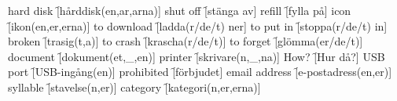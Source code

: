\begin{questions}
\begin{multicols}{2}
        \question hard disk \f[hårddisk(en,ar,arna)]
        \question shut off \f[stänga av]
        \question refill \f[fylla på]
        \question icon \f[ikon(en,er,erna)]
        \question to download \f[ladda(r/de/t) ner]
        \question to put in \f[stoppa(r/de/t) in]
        \question broken \f[trasig(t,a)]
        \question to crash \f[krascha(r/de/t)]
        \question to forget \f[glömma(er/de/t)]
        \question document \f[dokument(et,\_,en)]
        \question printer \f[skrivare(n,\_,na)]
        \question How? \f[Hur då?]
        \question USB port \f[USB-ingång(en)]
        \question prohibited \f[förbjudet]
        \question email address \f[e-postadress(en,er)]
        \question syllable \f[stavelse(n,er)]
        \question category \f[kategori(n,er,erna)]
    \end{multicols}
\end{questions}
